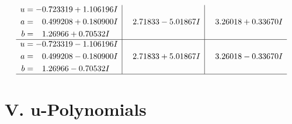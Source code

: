 \documentclass[1p]{elsarticle_modified}
\theoremstyle{definition}
\begin{document}
$$\begin{array}{c|c|c}
\begin{aligned}
u &= -0.723319 + 1.106196 I \\
a &= \phantom{-}0.499208 + 0.180900 I \\
b &= \phantom{-}1.26966 + 0.70532 I\end{aligned}
 & \phantom{-}2.71833 - 5.01867 I & \phantom{-}3.26018 + 0.33670 I \\ \hline\begin{aligned}
u &= -0.723319 - 1.106196 I \\
a &= \phantom{-}0.499208 - 0.180900 I \\
b &= \phantom{-}1.26966 - 0.70532 I\end{aligned}
 & \phantom{-}2.71833 + 5.01867 I & \phantom{-}3.26018 - 0.33670 I\\
 \hline 
 \end{array}$$\newpage
\newpage\renewcommand{\arraystretch}{1}
\centering \section*{ V. u-Polynomials}
\end{document}
